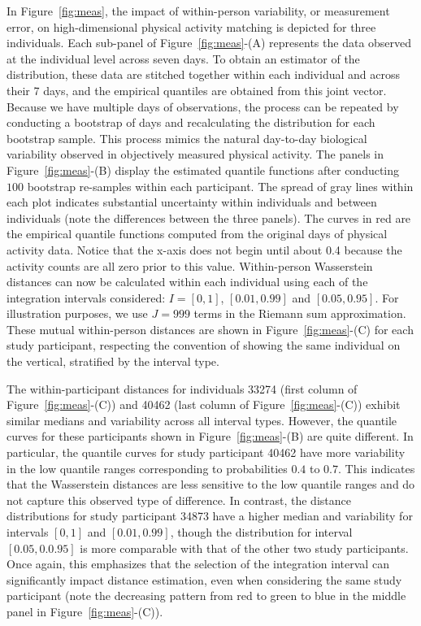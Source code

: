 In Figure~\ref{fig:meas}, the impact of within-person variability, or measurement error, on high-dimensional physical activity matching is depicted for three individuals. Each sub-panel of Figure~\ref{fig:meas}-(A) represents the data observed at the individual level across seven days. To obtain an estimator of the distribution, these data are stitched together within each individual and across their 7 days, and the empirical quantiles are obtained from this joint vector. Because we have multiple days of observations, the process can be repeated by conducting a bootstrap of days and recalculating the distribution for each bootstrap sample. This process mimics the natural day-to-day biological variability observed in objectively measured physical activity. The panels in Figure~\ref{fig:meas}-(B) display the estimated quantile functions after conducting $100$ bootstrap re-samples within each participant. The spread of gray lines within each plot indicates substantial uncertainty within individuals and between individuals (note the differences between the three panels). The curves in red are the empirical quantile functions computed from the original days of physical activity data. Notice that the x-axis does not begin until about 0.4 because the activity counts are all zero prior to this value. Within-person Wasserstein distances can now be calculated within each individual using each of the integration intervals considered: $I=[0,1]$, $[0.01,0.99]$ and $[0.05,0.95]$. For illustration purposes, we use $J=999$ terms in the Riemann sum approximation. These mutual within-person distances are shown in Figure~\ref{fig:meas}-(C) for each study participant, respecting the convention of showing the same individual on the vertical, stratified by the interval type. 

The within-participant distances for individuals 33274 (first column of Figure~\ref{fig:meas}-(C)) and 40462 (last column of Figure~\ref{fig:meas}-(C)) exhibit similar medians and variability across all interval types. However, the quantile curves for these participants shown in Figure~\ref{fig:meas}-(B) are quite different. In particular, the quantile curves for study participant 40462 have more variability in the low quantile ranges corresponding to probabilities $0.4$ to $0.7$. This indicates that the Wasserstein distances are less sensitive to the low quantile ranges and do not capture this observed type of difference. In contrast, the distance distributions for study participant 34873 have a higher median and variability for intervals $[0,1]$ and $[0.01,0.99]$, though the distribution for interval $[0.05,0.0.95]$ is more comparable with that of the other two study participants. Once again, this emphasizes that the selection of the integration interval can significantly impact distance estimation, even when considering the same study participant (note the decreasing pattern from red to green to blue in the middle panel in Figure~\ref{fig:meas}-(C)). 

